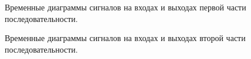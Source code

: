 \documentclass[spec, och, otchet, hidelinks]{SCWorks}
\begin{document}
\newpage

\begin{figure}[h!]
    \caption{Временные диаграммы сигналов на входах и выходах первой части последовательности.}
\end{figure}

\begin{figure}[h!]
	\caption{Временные диаграммы сигналов на входах и выходах второй части последовательности.}
\end{figure}
\end{document}

